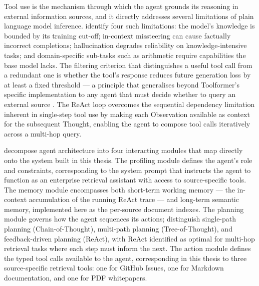 Tool use is the mechanism through which the agent grounds its reasoning in external information sources, and it directly addresses several limitations of plain language model inference.  identify four such limitations: the model's knowledge is bounded by its training cut-off; in-context missteering can cause factually incorrect completions; hallucination degrades reliability on knowledge-intensive tasks; and domain-specific sub-tasks such as arithmetic require capabilities the base model lacks. The filtering criterion that distinguishes a useful tool call from a redundant one is whether the tool's response reduces future generation loss by at least a fixed threshold — a principle that generalises beyond Toolformer's specific implementation to any agent that must decide whether to query an external source \cite{schick2023toolformer}. The ReAct loop overcomes the sequential dependency limitation inherent in single-step tool use by making each Observation available as context for the subsequent Thought, enabling the agent to compose tool calls iteratively across a multi-hop query.

 decompose agent architecture into four interacting modules that map directly onto the system built in this thesis. The profiling module defines the agent's role and constraints, corresponding to the system prompt that instructs the agent to function as an enterprise retrieval assistant with access to source-specific tools. The memory module encompasses both short-term working memory — the in-context accumulation of the running ReAct trace — and long-term semantic memory, implemented here as the per-source document indexes. The planning module governs how the agent sequences its actions;  distinguish single-path planning (Chain-of-Thought), multi-path planning (Tree-of-Thought), and feedback-driven planning (ReAct), with ReAct identified as optimal for multi-hop retrieval tasks where each step must inform the next. The action module defines the typed tool calls available to the agent, corresponding in this thesis to three source-specific retrieval tools: one for GitHub Issues, one for Markdown documentation, and one for PDF whitepapers.

